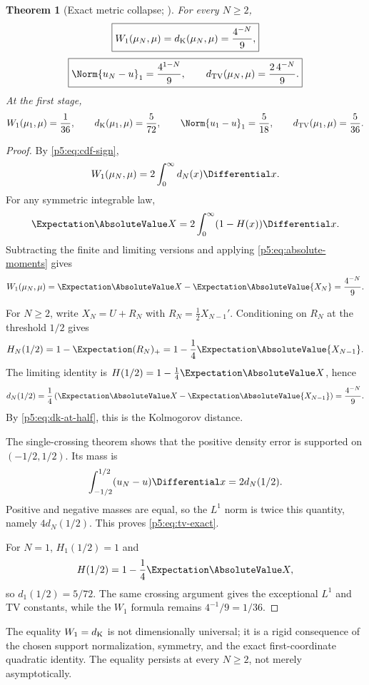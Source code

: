 \documentclass[11pt,oneside]{article}
\numberwithin{equation}{section}
\newtheorem{theorem}{Theorem}[section]
\theoremstyle{definition}
\theoremstyle{remark}
\begin{document}
\begin{theorem}[Exact metric collapse; \newresult]
For every $N\ge2$,
\begin{equation}
 \boxed{
 W_1(\mu_N,\mu)
 =d_{\rm K}(\mu_N,\mu)
 =\frac{4^{-N}}9,}
 \label{p5:eq:w1-dk}
\end{equation}
\begin{equation}
 \boxed{
 \Norm{u_N-u}_1=\frac{4^{1-N}}9,
 \qquad
 d_{\rm TV}(\mu_N,\mu)=\frac{2\,4^{-N}}9.}
 \label{p5:eq:tv-exact}
\end{equation}
At the first stage,
\begin{equation}
 W_1(\mu_1,\mu)=\frac1{36},
 \qquad
 d_{\rm K}(\mu_1,\mu)=\frac5{72},
 \qquad
 \Norm{u_1-u}_1=\frac5{18},
 \qquad
 d_{\rm TV}(\mu_1,\mu)=\frac5{36}.
 \label{p5:eq:first-exception}
\end{equation}
\end{theorem}

\begin{proof}
By \eqref{p5:eq:cdf-sign},
\[
 W_1(\mu_N,\mu)=2\int_0^\infty d_N(x)\Differential x.
\]
For any symmetric integrable law,
\[
 \Expectation\AbsoluteValue X=2\int_0^\infty(1-H(x))\Differential x.
\]
Subtracting the finite and limiting versions and applying \eqref{p5:eq:absolute-moments} gives
\[
 W_1(\mu_N,\mu)=\Expectation\AbsoluteValue X-\Expectation\AbsoluteValue{X_N}=\frac{4^{-N}}9.
\]

For $N\ge2$, write $X_N=U+R_N$ with $R_N=\tfrac12X_{N-1}'$.  Conditioning on $R_N$ at the threshold $1/2$ gives
\[
 H_N(1/2)=1-\Expectation(R_N)_+=1-\frac14\Expectation\AbsoluteValue{X_{N-1}}.
\]
The limiting identity is $H(1/2)=1-\tfrac14\Expectation\AbsoluteValue X$, hence
\[
 d_N(1/2)=\frac14\left(\Expectation\AbsoluteValue X-\Expectation\AbsoluteValue{X_{N-1}}\right)
 =\frac{4^{-N}}9.
\]
By \eqref{p5:eq:dk-at-half}, this is the Kolmogorov distance.

The single-crossing theorem shows that the positive density error is supported on $(-1/2,1/2)$.  Its mass is
\[
 \int_{-1/2}^{1/2}(u_N-u)\Differential x
 =2d_N(1/2).
\]
Positive and negative masses are equal, so the $L^1$ norm is twice this quantity, namely $4d_N(1/2)$.  This proves \eqref{p5:eq:tv-exact}.

For $N=1$, $H_1(1/2)=1$ and
\[
 H(1/2)=1-\frac14\Expectation\AbsoluteValue X,
\]
so $d_1(1/2)=5/72$.  The same crossing argument gives the exceptional $L^1$ and TV constants, while the $W_1$ formula remains $4^{-1}/9=1/36$.
\end{proof}

\begin{remark}
The equality $W_1=d_{\rm K}$ is not dimensionally universal; it is a rigid consequence of the chosen support normalization, symmetry, and the exact first-coordinate quadratic identity.  The equality persists at every $N\ge2$, not merely asymptotically.
\end{remark}
\end{document}
